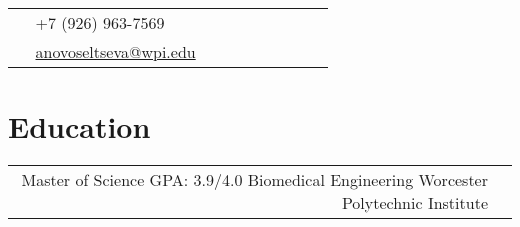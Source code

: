 \documentclass[10pt]{article} %
\begin{document}
\begin{paracol}{2}

\parbox[top][0.12\textheight][c]{\linewidth}{ %
	\vspace{-0.04\textheight} %
	\colorbox{shade}{ %
		\begin{supertabular}{p{0.05\linewidth}|p{0.775\linewidth}} %
			\raisebox{-1pt}{\faPhone} & +7 (926) 963-7569 \\ %
			\raisebox{0pt}{\small\faEnvelope} & \href{mailto:anovoseltseva@wpi.edu}{anovoseltseva@wpi.edu} \\ 
		\end{supertabular}
	}
}


\section{Education} 





\begin{supertabular}{rl} %

	{Master of Science} %
	{GPA: 3.9/4.0} %
	{Biomedical Engineering} %
	{Worcester Polytechnic Institute} %
	
	

\end{supertabular}
\end{paracol}
\end{document}
